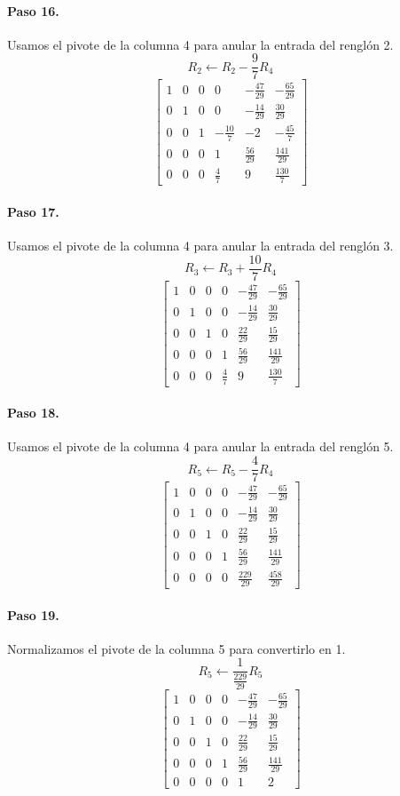 \documentclass[12pt]{article}
\theoremstyle{remark}
\begin{document}
\paragraph{Paso 16.} Usamos el pivote de la columna 4 para anular la entrada del renglón 2.
\[
R_{2}\leftarrow R_{2}-\frac{9}{7}R_{4}
\]
\[
\left[\begin{array}{ccccc|c}
1 & 0 & 0 & 0 & - \frac{47}{29} & - \frac{65}{29}\\
0 & 1 & 0 & 0 & - \frac{14}{29} & \frac{30}{29}\\
0 & 0 & 1 & - \frac{10}{7} & -2 & - \frac{45}{7}\\
0 & 0 & 0 & 1 & \frac{56}{29} & \frac{141}{29}\\
0 & 0 & 0 & \frac{4}{7} & 9 & \frac{130}{7}
\end{array}\right]
\]
\paragraph{Paso 17.} Usamos el pivote de la columna 4 para anular la entrada del renglón 3.
\[
R_{3}\leftarrow R_{3}+\frac{10}{7}R_{4}
\]
\[
\left[\begin{array}{ccccc|c}
1 & 0 & 0 & 0 & - \frac{47}{29} & - \frac{65}{29}\\
0 & 1 & 0 & 0 & - \frac{14}{29} & \frac{30}{29}\\
0 & 0 & 1 & 0 & \frac{22}{29} & \frac{15}{29}\\
0 & 0 & 0 & 1 & \frac{56}{29} & \frac{141}{29}\\
0 & 0 & 0 & \frac{4}{7} & 9 & \frac{130}{7}
\end{array}\right]
\]
\paragraph{Paso 18.} Usamos el pivote de la columna 4 para anular la entrada del renglón 5.
\[
R_{5}\leftarrow R_{5}-\frac{4}{7}R_{4}
\]
\[
\left[\begin{array}{ccccc|c}
1 & 0 & 0 & 0 & - \frac{47}{29} & - \frac{65}{29}\\
0 & 1 & 0 & 0 & - \frac{14}{29} & \frac{30}{29}\\
0 & 0 & 1 & 0 & \frac{22}{29} & \frac{15}{29}\\
0 & 0 & 0 & 1 & \frac{56}{29} & \frac{141}{29}\\
0 & 0 & 0 & 0 & \frac{229}{29} & \frac{458}{29}
\end{array}\right]
\]
\paragraph{Paso 19.} Normalizamos el pivote de la columna 5 para convertirlo en 1.
\[
R_{5}\leftarrow \frac{1}{\frac{229}{29}}R_{5}
\]
\[
\left[\begin{array}{ccccc|c}
1 & 0 & 0 & 0 & - \frac{47}{29} & - \frac{65}{29}\\
0 & 1 & 0 & 0 & - \frac{14}{29} & \frac{30}{29}\\
0 & 0 & 1 & 0 & \frac{22}{29} & \frac{15}{29}\\
0 & 0 & 0 & 1 & \frac{56}{29} & \frac{141}{29}\\
0 & 0 & 0 & 0 & 1 & 2
\end{array}\right]
\]
\end{document}
